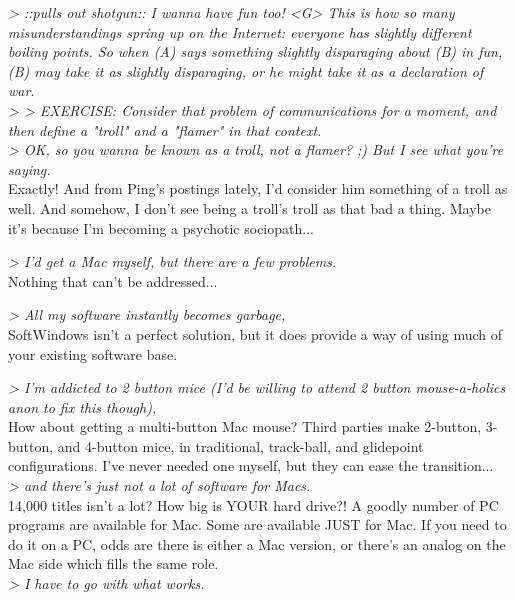 \documentclass[11pt,twoside,a4paper]{article}
\begin{document}
\begin{multicols*}{2}
\emph{> ::pulls out shotgun::  I wanna have fun too!  <G> This is how so many misunderstandings spring up on the Internet: everyone has slightly different boiling points. So when (A) says something slightly disparaging about (B) in fun, (B) may take it as slightly disparaging, or he might take it as a declaration of war.}~\\

\emph{> > EXERCISE: Consider that problem of communications for a moment, and then define a "troll" and a "flamer" in that context.}~\\

\emph{> OK, so you wanna be known as a troll, not a flamer?  ;)  But I see what you're saying. }~\\

Exactly! And from Ping's postings lately, I'd consider him something of a troll as well. And somehow, I don't see being a troll's troll as that bad a thing. Maybe it's because I'm becoming a psychotic sociopath...

\emph{> I'd get a Mac myself, but there are a few problems.}~\\

Nothing that can't be addressed...

\emph{> All my software instantly becomes garbage, }~\\

SoftWindows isn't a perfect solution, but it does provide a way of using much of your existing software base.

\emph{> I'm addicted to 2 button mice (I'd be willing to attend 2 button mouse-a-holics anon to fix this though), }~\\

How about getting a multi-button Mac mouse? Third parties make 2-button, 3-button, and 4-button mice, in traditional, track-ball, and glidepoint configurations. I've never needed one myself, but they can ease the transition...~\\

\emph{> and there's just not a lot of software for Macs.}~\\

14,000 titles isn't a lot? How big is YOUR hard drive?! A goodly number of PC programs are available for Mac. Some are available JUST for Mac. If you need to do it on a PC, odds are there is either a Mac version, or there's an analog on the Mac side which fills the same role.~\\

\emph{> I have to go with what works. }~\\


\end{multicols*}
\end{document}
